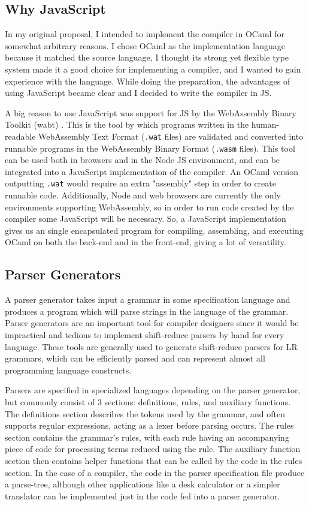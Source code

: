 \documentclass[12pt,a4paper,twoside,openright]{report}
\begin{document}
\subsection{Why JavaScript}
In my original proposal, I intended to implement the compiler in OCaml for somewhat arbitrary reasons.
I chose OCaml as the implementation language because it matched the source language, I thought its strong yet flexible type system made it a good choice for implementing a compiler, and I wanted to gain experience with the language.
While doing the preparation, the advantages of using JavaScript became clear and I decided to write the compiler in JS.

A big reason to use JavaScript was support for JS by the WebAssembly Binary Toolkit (wabt) \cite{wabt}.
This is the tool by which programs written in the human-readable WebAssembly Text Format ({\tt .wat} files) are validated and converted into runnable programs in the WebAssembly Binary Format ({\tt .wasm} files).
This tool can be used both in browsers and in the Node JS environment, and can be integrated into a JavaScript implementation of the compiler.
An OCaml version outputting {\tt .wat} would require an extra "assembly" step in order to create runnable code.
Additionally, Node and web browsers are currently the only environments supporting WebAssembly, so in order to run code created by the compiler some JavaScript will be necessary.
So, a JavaScript implementation gives us an single encapsulated program for compiling, assembling, and executing OCaml on both the back-end and in the front-end, giving a lot of versatility.

\subsection{Parser Generators}
A parser generator takes input a grammar in some specification language and produces a program which will parse strings in the language of the grammar.
Parser generators are an important tool for compiler designers since it would be impractical and tedious to implement shift-reduce parsers by hand for every language.
These tools are generally used to generate shift-reduce parsers for LR grammars, which can be efficiently parsed and can represent almost all programming language constructs.

Parsers are specified in specialized languages depending on the parser generator, but commonly consist of 3 sections: definitions, rules, and auxiliary functions.
The definitions section describes the tokens used by the grammar, and often supports regular expressions, acting as a lexer before parsing occurs.
The rules section contains the grammar's rules, with each rule having an accompanying piece of code for processing terms reduced using the rule.
The auxiliary function section then contains helper functions that can be called by the code in the rules section.
In the case of a compiler, the code in the parser specification file produce a parse-tree, although other applications like a desk calculator or a simpler translator can be implemented just in the code fed into a parser generator.
\end{document}
